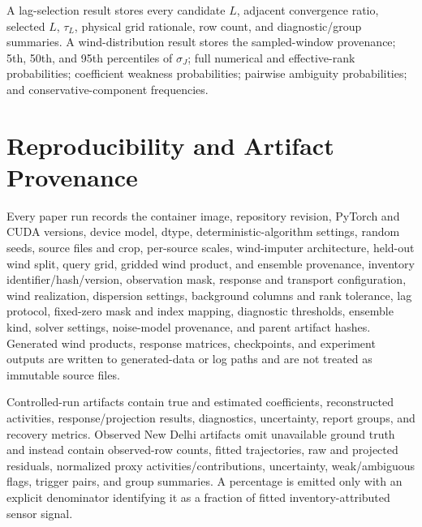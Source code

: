 A lag-selection result stores every candidate \(L\), adjacent convergence
ratio, selected \(L\), \(\tau_L\), physical grid rationale, row count, and
diagnostic/group summaries.  A wind-distribution result stores the sampled-window
provenance; 5th, 50th, and 95th percentiles of \(\sigma_J\); full numerical and
effective-rank probabilities; coefficient weakness probabilities; pairwise
ambiguity probabilities; and conservative-component frequencies.

\section{Reproducibility and Artifact Provenance}
\label{app:reproducibility}

Every paper run records the container image, repository revision, PyTorch and
CUDA versions, device model, dtype, deterministic-algorithm settings, random
seeds, source files and crop, per-source scales, wind-imputer architecture, held-out wind split, query grid, gridded wind product, and ensemble provenance,
inventory identifier/hash/version, observation mask, response and transport
configuration, wind realization, dispersion settings, background columns and
rank tolerance, lag protocol, fixed-zero mask and index mapping, diagnostic
thresholds, ensemble kind, solver settings, noise-model provenance, and parent
artifact hashes.
Generated wind products, response matrices, checkpoints, and experiment outputs
are written to generated-data or log paths and are not treated as immutable
source files.

Controlled-run artifacts contain true and estimated coefficients, reconstructed
activities, response/projection results, diagnostics, uncertainty, report
groups, and recovery metrics.  Observed New Delhi artifacts omit unavailable
ground truth and instead contain observed-row counts, fitted trajectories, raw
and projected residuals, normalized proxy activities/contributions,
uncertainty, weak/ambiguous flags, trigger pairs, and group summaries.  A
percentage is emitted only with an explicit denominator identifying it as a
fraction of fitted inventory-attributed sensor signal.
